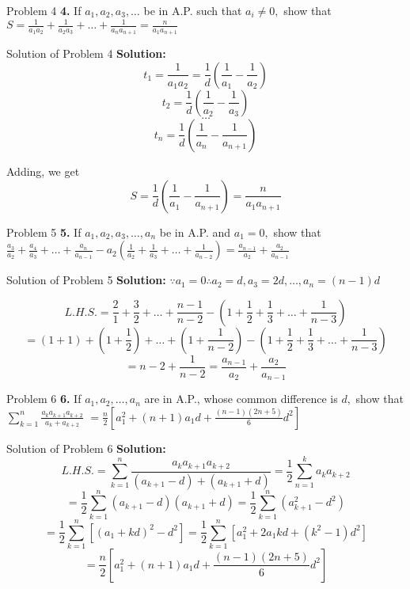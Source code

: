 \documentclass[aspectratio=1610,8pt]{beamer}
\begin{document}
\begin{frame}{Problem 4}
  \textbf{4.} If $a_1, a_2, a_3, \ldots$ be in A.P. such that $a_i\neq 0,$ show that $S = \frac{1}{a_1a_2} + \frac{1}{a_2a_3}
  + \ldots + \frac{1}{a_na_{n + 1}} = \frac{n}{a_1a_{n + 1}}$
\end{frame}
\begin{frame}{Solution of Problem 4}
  \textbf{Solution:} $$t_1 = \frac{1}{a_1a_2} = \frac{1}{d}\left(\frac{1}{a_1} - \frac{1}{a_2}\right)$$
  $$t_2 = \frac{1}{d}\left(\frac{1}{a_2} - \frac{1}{a_3}\right)$$
  $$\ldots$$
  $$t_n = \frac{1}{d}\left(\frac{1}{a_n} - \frac{1}{a_{n + 1}}\right)$$

  Adding, we get $$S = \frac{1}{d}\left(\frac{1}{a_1} - \frac{1}{a_{n + 1}}\right) = \frac{n}{a_1a_{n + 1}}$$
\end{frame}
\begin{frame}{Problem 5}
  \textbf{5.} If $a_1, a_2, a_3, \ldots, a_n$ be in A.P. and $a_1 = 0,$ show that $\frac{a_3}{a_2} + \frac{a_4}{a_3} + \ldots +
  \frac{a_n}{a_{n - 1}} - a_2\left(\frac{1}{a_2} + \frac{1}{a_3} + \ldots + \frac{1}{a_{n - 2}}\right) = \frac{a_{n - 1}}{a_2} +
  \frac{a_2}{a_{n - 1}}$
\end{frame}
\begin{frame}{Solution of Problem 5}
  \textbf{Solution:} $\because a_1 = 0 \therefore a_2 = d, a_3 = 2d, \ldots, a_n = (n - 1)d$

  $$L.H.S. = \frac{2}{1} + \frac{3}{2} + \ldots + \frac{n - 1}{n - 2} - \left(1 + \frac{1}{2} + \frac{1}{3} + \ldots + \frac{1}{n -
    3}\right)$$
  $$= (1 + 1) + \left(1 + \frac{1}{2}\right) + \ldots + \left(1 + \frac{1}{n - 2}\right) - \left(1 + \frac{1}{2} + \frac{1}{3} +
  \ldots + \frac{1}{n - 3}\right)$$
  $$= n - 2 + \frac{1}{n - 2} = \frac{a_{n - 1}}{a_2} + \frac{a_2}{a_{n - 1}}$$
\end{frame}
\begin{frame}{Problem 6}
  \textbf{6.} If $a_1, a_2, \ldots, a_n$ are in A.P., whose common difference is $d,$ show that $\sum_{k = 1}^n\frac{a_ka_{k +
      1}a_{k + 2}}{a_k+a_{k + 2}}$ $= \frac{n}{2}\left[a_1^2 + (n + 1)a_1d + \frac{(n - 1)(2n + 5)}{6}d^2\right]$
\end{frame}
\begin{frame}{Solution of Problem 6}
  \textbf{Solution:}$$L.H.S. = \sum_{k = 1}^n\frac{a_ka_{k + 1}a_{k + 2}}{(a_{k + 1} - d) + (a_{k + 1} + d)} = \frac{1}{2}\sum_{n =
      1}^ka_ka_{k + 2}$$
  $$= \frac{1}{2}\sum_{k = 1}^n(a_{k + 1} - d)(a_{k + 1} + d) = \frac{1}{2}\sum_{k = 1}^n(a_{k + 1}^2 - d^2)$$
  $$= \frac{1}{2}\sum_{k = 1}^n[(a_1 + kd)^2 - d^2] = \frac{1}{2}\sum_{k = 1}^n[a_1^2 + 2a_1kd + (k^2 - 1)d^2]$$
  $$= \frac{n}{2}\left[a_1^2 + (n + 1)a_1d + \frac{(n - 1)(2n + 5)}{6}d^2\right]$$
\end{frame}
\end{document}
